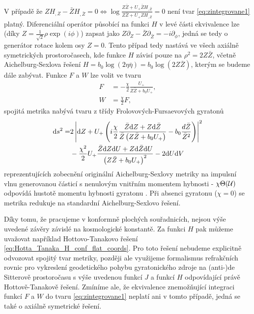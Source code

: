 V případě že $Z H_{,Z} - \bar{Z}H_{,\bar{Z}}=0 \iff \log \frac{Z \bar{Z} + U_{+}\bar{Z}H_{,\bar{Z}}}{Z\bar{Z}+U_{+}ZH_{,Z}}=0$
není tvar \eqref{eq:zintegrovane1} platný. Diferenciální operátor působící na funkci $H$ v levé části ekvivalence
lze (díky $Z = \frac{1}{\sqrt{2}} \rho \exp(i \phi)$) zapsat jako $Z \partial_Z - \bar{Z}\partial_{\bar{Z}} = - i \partial_\phi$,
jedná se tedy o generátor rotace kolem osy $Z = 0$. Tento případ tedy nastává ve všech axiálně symetrických prostoročasech, kde
funkce $H$ závisí pouze na $\rho^2 = 2 Z \bar{Z}$, včetně Aichelburg-Sexlova řešení
$H = b_0 \log(2\eta \bar{\eta}) = b_0 \log (2Z \bar{Z})$, kterým se budeme dále zabývat.
Funkce $F$ a $W$ lze volit ve tvaru
\begin{equation}
    \label{eq:zintegrovane2}
    \begin{split}
        F &= -\frac{\chi}{2} \frac{U_{+}}{Z \bar{Z} + b_0 U_{+}}, \\
        W &= \frac{\chi}{2}F,
    \end{split}
\end{equation}
spojitá metrika nabývá tvaru z třídy Frolovových-Fursaevových gyratonů \cite{Frolov2005} 
\begin{equation}
    \begin{split}
    \mathrm{d} s^2 = &2 \left| \mathrm{d} Z + U_{+} \left(i \frac{\chi}{2}\frac{\bar{Z}\mathrm{d} Z + Z \mathrm{d} \bar{Z}}{\bar{Z}\left(Z \bar{Z} + b_0 U_{+}\right)} - b_0 \frac{d\bar{Z}}{\bar{Z}^2}\right) \right|^2 \\
    &- \frac{\chi^2}{2}U_{+}\frac{\bar{Z} \mathrm{d} Z \mathrm{d} U + Z \mathrm{d} \bar{Z} \mathrm{d} U}{\left(Z \bar{Z} + b_0 U_{+}\right)^2} - 2 \mathrm{d} U \mathrm{d} V
    \end{split}
\end{equation}
reprezentujících zobecnění
originální Aichelburg-Sexlovy metriky \cite{Aichelburg_1971} na impulsní vlnu generovanou částicí s
nenulovým vnitřním momentem hybnosti - $\chi \Theta(\mathcal{U})$ odpovídá hustotě momentu hybnosti gyratonu \cite{Podolsky2014}.
Při absenci gyratonu ($\chi=0$) se metrika redukuje na standardní Aichelburg-Sexlovo řešení.

Díky tomu, že pracujeme v konformně plochých souřadnicích, nejsou výše uvedené závěry závislé na kosmologické konstantě.
Za funkci $H$ pak můžeme uvažovat například Hottovo-Tanakovo řešení \eqref{eq:Hotta_Tanaka_H_conf_flat_coords}. Pro toto řešení nebudeme explicitně odvozovat
spojitý tvar metriky, později ale využijeme formalismus refrakčních rovnic pro vykreslení geodetického pohybu gyratonického zdroje na (anti-)de Sitterově prostoročasu
s výše uvedenou funkcí $J$ a funkcí $H$ odpovídající právě Hottově-Tanakově řešení. Zmíníme ale, že ekvivalence znemožňující integraci funkcí $F$ a $W$ do tvaru
\eqref{eq:zintegrovane1} neplatí ani v tomto případě, jedná se také o axiálně symetrické řešení.


